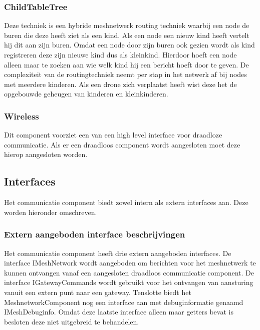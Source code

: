 \documentclass[a4paper, 11pt, oneside]{report}
\begin{document}
\subsubsection{ChildTableTree}
\label{architectural:subcomponenten:ChildTableTree}
Deze techniek is een hybride meshnetwerk routing techniek waarbij een node de buren die deze heeft ziet als een kind.
Als een node een nieuw kind heeft vertelt hij dit aan zijn buren.
Omdat een node door zijn buren ook gezien wordt als kind registreren deze zijn nieuwe kind dus als kleinkind.
Hierdoor hoeft een node alleen maar te zoeken aan wie welk kind hij een bericht hoeft door te geven. 
De complexiteit van de routingtechniek neemt per stap in het netwerk af bij nodes met meerdere kinderen.
Als een drone zich verplaatst heeft wist deze het de opgebouwde geheugen van kinderen en kleinkinderen. 

\subsubsection{Wireless}
\label{architectural:subcomponenten:Wireless}
Dit component voorziet een  van een high level interface voor draadloze communicatie.
Als er een draadloos component wordt aangesloten moet deze hierop aangesloten worden. 
\subsection{Interfaces}
\label{DetailedDesign:CommunicatieComponentDiagram:interface}
Het communicatie component biedt zowel intern als extern interfaces aan. Deze worden hieronder omschreven.

\subsubsection{Extern aangeboden interface beschrijvingen}
\label{DetailedDesign:CommunicatieComponentDiagram:interface:extern}
Het communicatie component heeft drie extern aangeboden interfaces. De interface IMeshNetwork wordt aangeboden om berichten voor het meshnetwerk te kunnen ontvangen vanaf een aangesloten draadloos communicatie component. De interface IGatewayCommands wordt gebruikt voor het ontvangen van aansturing vanuit een extern punt naar een gateway. Tenslotte biedt het MeshnetworkComponent nog een interface aan met debuginformatie genaamd IMeshDebuginfo. Omdat deze laatste interface alleen maar getters bevat is besloten deze niet uitgebreid te behandelen.
\end{document}

